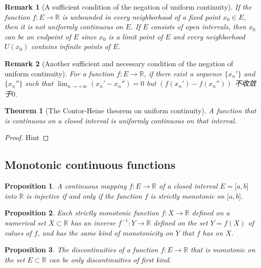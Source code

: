 \documentclass[onecolumn]{ctexart}
\newtheorem{theorem}{Theorem}
\newtheorem{proposition}{Proposition}
\newtheorem{remark}{Remark}
\begin{document}
\begin{remark}[A sufficient condition of the negation of uniform continuity]
  If the function $f: E \to \mathbb{R}$ is unbounded in every neighborhood of a 
  fixed point $x_0 \in E$, then it is not uniformly continuous on $E$. If $E$ 
  consists of open intervals, then $x_0$ can be an endpoint of $E$ since $x_0$ 
  is a limit point of $E$ and every neighborhood $U(x_0)$ contains infinite 
  points of $E$.
\end{remark}
\begin{remark}[Another sufficient and necessary condition of the negation of uniform continuity]
  For a function $f: E \to \mathbb{R}$, if there exist a sequence $\lbrace x_n' 
  \rbrace$ and $\lbrace x_n'' \rbrace$ such that $\lim_{n \to +\infty} (x_n' - 
  x_n'') = 0$ but $(f(x_n') - f(x_n''))$ 不收敛于$0$.
\end{remark}

\begin{theorem}[The Contor-Heine theorem on uniform continuity]
  A function that is continuous on a closed interval is uniformly continuous on 
  that interval.
\end{theorem}
\begin{proof}
  Hint
\end{proof}

\subsection{Monotonic continuous functions}

\begin{proposition}
  A continuous mapping $f:E \to \mathbb{R}$ of a closed interval 
  $E = \lbrack a,b \rbrack$ into $\mathbb{R}$ is injective if and only if the 
  function $f$ is strictly monotonic on $\lbrack a,b \rbrack$.
\end{proposition}

\begin{proposition}
  Each strictly monotonic function $f:X \to \mathbb{R}$ defined on a numerical 
  set $X \subset \mathbb{R}$ has an inverse $f^{-1}:Y \to \mathbb{R}$ defined on 
  the set $Y = f(X)$ of values of $f$, and has the same kind of monotonicity on 
  $Y$ that $f$ has on $X$.
\end{proposition}

\begin{proposition}
  The discontinuities of a function $f:E \to \mathbb{R}$ that is monotonic on 
  the set $E \subset \mathbb{R}$ can be only discontinuities of first kind.
\end{proposition}
\end{document}
